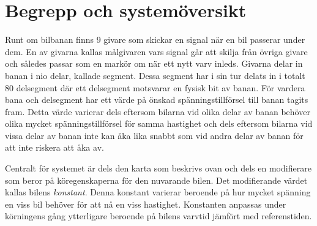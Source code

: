 \section{Begrepp och systemöversikt}
\label{sec:begrepp och systemöversikt}

Runt om bilbanan finns 9 givare som skickar en signal när en bil passerar under
dem. En av givarna kallas målgivaren vars signal går att skilja från övriga
givare och således passar som en markör om när ett nytt varv inleds. Givarna
delar in banan i nio delar, kallade segment. Dessa segment har i sin tur delats
in i totalt 80 delsegment där ett delsegment motsvarar en fysisk bit av banan.
För vardera bana och delsegment har ett värde på önskad spänningstillförsel till
banan tagits fram. Detta värde varierar dels eftersom bilarna vid olika delar
av banan behöver olika mycket spänningstillförsel för samma hastighet och dels
eftersom bilarna vid vissa delar av banan inte kan åka lika snabbt som vid andra
delar av banan för att inte riskera att åka av.

Centralt för systemet är dels den karta som beskrivs ovan och dels en
modifierare som beror på köregenskaperna för den nuvarande bilen. Det
modifierande värdet kallas bilens \emph{konstant}. Denna konstant varierar
beroende på hur mycket spänning en viss bil behöver för att nå en viss
hastighet. Konstanten anpassas under körningens gång ytterligare beroende på
bilens varvtid jämfört med referenstiden.

